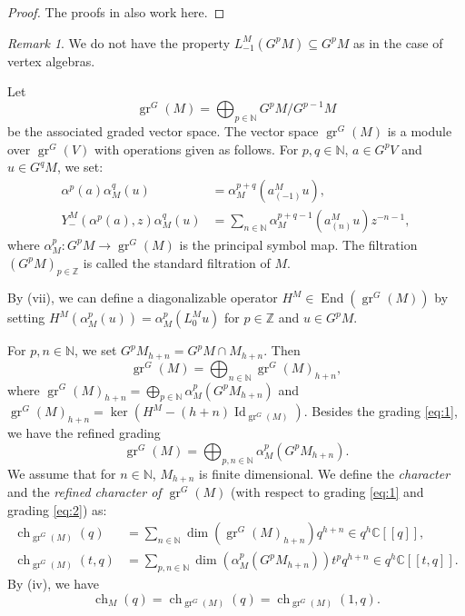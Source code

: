 \documentclass[a4paper, 12pt, reqno]{amsart}
\theoremstyle{remark}
\newtheorem{remark}[theorem]{Remark}
\DeclareMathOperator{\Id}{Id}
\DeclareMathOperator{\gr}{gr}
\DeclareMathOperator{\End}{End}
\DeclareMathOperator{\ch}{ch}
\begin{document}
\begin{proof}
  The proofs in \cite{li_vertex_2004} also work here.
\end{proof}

\begin{remark}
  \label{rmk:1}
  We do not have the property $L_{-1}^M(G^pM) \subseteq G^pM$ as in the case of vertex algebras.
\end{remark}

Let
\begin{equation*}
  \gr^G(M) = \bigoplus_{p \in \mathbb{N}}G^pM/G^{p - 1}M
\end{equation*}
be the associated graded vector space.
The vector space $\gr^G(M)$ is a module over $\gr^G(V)$ with operations given as follows.
For $p, q \in \mathbb{N}$, $a \in G^pV$ and $u \in G^qM$, we set:
\begin{align*}
  \alpha^p(a)\alpha_M^q(u) &= \alpha_M^{p + q}(a^M_{(-1)}u), \\
  Y^M_-(\alpha^p(a), z)\alpha_M^q(u) &= \sum_{n \in \mathbb{N}}\alpha_M^{p + q - 1}(a^M_{(n)}u)z^{-n - 1},
\end{align*}
where $\alpha_M^p: G^pM \to \gr^G(M)$ is the principal symbol map.
The filtration $(G^pM)_{p \in \mathbb{Z}}$ is called the standard filtration of $M$.

By (vii), we can define a diagonalizable operator $H^M \in \End(\gr^G(M))$ by setting $H^M(\alpha^p_M(u)) = \alpha^p_M(L^M_0u)$ for $p \in \mathbb{Z}$ and $u \in G^pM$.

For $p, n \in \mathbb{N}$, we set $G^pM_{h + n} = G^pM \cap M_{h + n}$.
Then
\begin{equation}
  \label{eq:1}
  \gr^G(M) = \bigoplus_{n \in \mathbb{N}}\gr^G(M)_{h + n},
\end{equation}
where $\gr^G(M)_{h + n} = \bigoplus_{p \in \mathbb{N}}\alpha^p_M(G^pM_{h + n})$ and $\gr^G(M)_{h + n} = \ker(H^M - (h + n)\Id_{\gr^G(M)})$.
Besides the grading \eqref{eq:1}, we have the refined grading
\begin{equation}
  \label{eq:2}
  \gr^G(M) = \bigoplus_{p, n \in \mathbb{N}}\alpha^p_M(G^pM_{h + n}).
\end{equation}
We assume that for $n \in \mathbb{N}$, $M_{h + n}$ is finite dimensional.
We define the \emph{character} and the \emph{refined character of $\gr^G(M)$} (with respect to grading \eqref{eq:1} and grading \eqref{eq:2}) as:
\begin{align*}
  \ch_{\gr^G(M)}(q) &= \sum_{n \in \mathbb{N}}\dim(\gr^G(M)_{h + n})q^{h + n} \in q^h\mathbb{C}[[q]], \\
  \ch_{\gr^G(M)}(t, q) &= \sum_{p, n \in \mathbb{N}}\dim(\alpha^p_M(G^pM_{h + n}))t^pq^{h + n} \in q^{h}\mathbb{C}[[t, q]].
\end{align*}
By (iv), we have
\begin{equation*}
  \ch_M(q) = \ch_{\gr^G(M)}(q) = \ch_{\gr^G(M)}(1, q).
\end{equation*}
\end{document}
